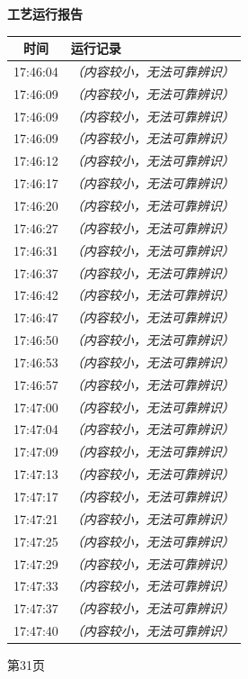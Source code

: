 \documentclass[UTF8,10pt,a4paper,fontset=fandol]{ctexart}
\begin{document}
\vspace{14pt}

\noindent
\begin{minipage}[t]{0.47\textwidth}
\centering
\textbf{工艺运行报告}

\vspace{2pt}
\begin{tabularx}{\linewidth}{|c|X|}
\hline
\textbf{时间} & \textbf{运行记录}\\ \hline
17:46:04 & \textit{（内容较小，无法可靠辨识）}\\ \hline
17:46:09 & \textit{（内容较小，无法可靠辨识）}\\ \hline
17:46:09 & \textit{（内容较小，无法可靠辨识）}\\ \hline
17:46:09 & \textit{（内容较小，无法可靠辨识）}\\ \hline
17:46:12 & \textit{（内容较小，无法可靠辨识）}\\ \hline
17:46:17 & \textit{（内容较小，无法可靠辨识）}\\ \hline
17:46:20 & \textit{（内容较小，无法可靠辨识）}\\ \hline
17:46:27 & \textit{（内容较小，无法可靠辨识）}\\ \hline
17:46:31 & \textit{（内容较小，无法可靠辨识）}\\ \hline
17:46:37 & \textit{（内容较小，无法可靠辨识）}\\ \hline
17:46:42 & \textit{（内容较小，无法可靠辨识）}\\ \hline
17:46:47 & \textit{（内容较小，无法可靠辨识）}\\ \hline
17:46:50 & \textit{（内容较小，无法可靠辨识）}\\ \hline
17:46:53 & \textit{（内容较小，无法可靠辨识）}\\ \hline
17:46:57 & \textit{（内容较小，无法可靠辨识）}\\ \hline
17:47:00 & \textit{（内容较小，无法可靠辨识）}\\ \hline
17:47:04 & \textit{（内容较小，无法可靠辨识）}\\ \hline
17:47:09 & \textit{（内容较小，无法可靠辨识）}\\ \hline
17:47:13 & \textit{（内容较小，无法可靠辨识）}\\ \hline
17:47:17 & \textit{（内容较小，无法可靠辨识）}\\ \hline
17:47:21 & \textit{（内容较小，无法可靠辨识）}\\ \hline
17:47:25 & \textit{（内容较小，无法可靠辨识）}\\ \hline
17:47:29 & \textit{（内容较小，无法可靠辨识）}\\ \hline
17:47:33 & \textit{（内容较小，无法可靠辨识）}\\ \hline
17:47:37 & \textit{（内容较小，无法可靠辨识）}\\ \hline
17:47:40 & \textit{（内容较小，无法可靠辨识）}\\ \hline
\end{tabularx}

\vspace{4pt}
{\scriptsize 第31页}
\end{minipage}
\end{document}

